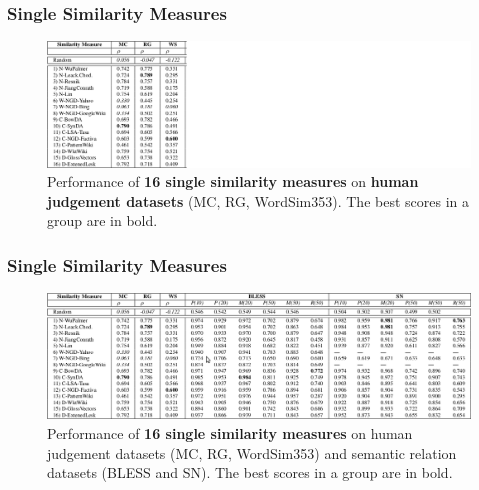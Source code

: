 \documentclass{beamer}
\begin{document}
\begin{frame}
\frametitle{Single Similarity Measures}
	\begin{figure}
	\centering
		\includegraphics[width=1.0\textwidth]{figures/table-hybrid-single-hg}
		
		\caption{ Performance of \textbf{16 single similarity measures} on \textbf{human judgement datasets} (MC, RG,
WordSim353). The best scores in a group are in
bold. 
}
\end{figure}
	
\end{frame}


\begin{frame}
\frametitle{Single Similarity Measures}
	\begin{figure}
	\centering
		\includegraphics[width=1.0\textwidth]{figures/table-hybrid-single}
		
		\caption{ Performance of \textbf{16 single similarity measures} on human judgement datasets (MC, RG,
WordSim353) and semantic relation datasets (BLESS and SN). The best scores in a group are in
bold. 
}
\end{figure}
	
\end{frame}
\end{document}
